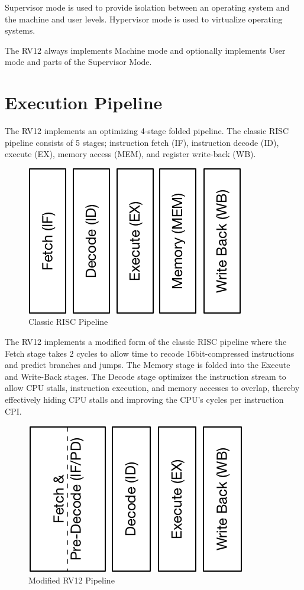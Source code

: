 Supervisor mode is used to provide isolation between an operating system and the machine and user levels. Hypervisor mode is used to virtualize operating systems.

The RV12 always implements Machine mode and optionally implements User mode and parts of the Supervisor Mode.

\section{Execution Pipeline}\label{execution-pipeline}

The RV12 implements an optimizing 4-stage folded pipeline. The classic RISC pipeline consists of 5 stages; instruction fetch (IF), instruction decode (ID), execute (EX), memory access (MEM), and register write-back (WB).

\begin{figure}[hbt]
  \includegraphics{assets/img/Pipeline-Reg.png}
  \caption{Classic RISC Pipeline}
\end{figure}

The RV12 implements a modified form of the classic RISC pipeline where the
Fetch stage takes 2 cycles to allow time to recode 16bit-compressed
instructions and predict branches and jumps. The Memory stage is folded
into the Execute and Write-Back stages. The Decode stage optimizes the
instruction stream to allow CPU stalls, instruction execution, and
memory accesses to overlap, thereby effectively hiding CPU stalls and
improving the CPU's cycles per instruction CPI.

\begin{figure}[hbt]
  \includegraphics{assets/img/Pipeline-RV12.png}
  \caption{Modified RV12 Pipeline}
\end{figure}

